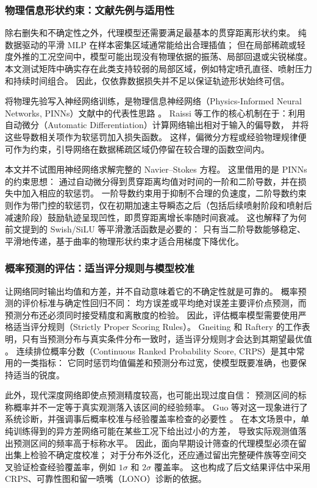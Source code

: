 \subsubsection{物理信息形状约束：文献先例与适用性}

除右删失和不确定性之外，代理模型还需要满足最基本的贯穿距离形状约束。
纯数据驱动的平滑 MLP 在样本密集区域通常能给出合理插值；
但在局部稀疏或轻度外推的工况空间中，模型可能出现没有物理依据的振荡、局部回退或尖锐梯度。
本文测试矩阵中确实存在此类支持较弱的局部区域，例如特定喷孔直径、喷射压力和持续时间组合。
因此，仅依靠数据损失并不足以保证轨迹形状始终可信。

将物理先验写入神经网络训练，是物理信息神经网络（Physics-Informed Neural Networks, PINNs）文献中的代表性思路 \cite{Raissi2019PINNs}。
Raissi 等工作的核心机制在于：利用自动微分（Automatic Differentiation）计算网络输出相对于输入的偏导数，
并将这些导数相关项作为软惩罚加入损失函数。
这样，偏微分方程或经验物理规律便可作为约束，引导网络在数据稀疏区域仍停留在较合理的函数空间内。

本文并不试图用神经网络求解完整的 Navier--Stokes 方程。
这里借用的是 PINNs 的约束思想：
通过自动微分得到贯穿距离均值对时间的一阶和二阶导数，并在损失中加入相应的软惩罚。
一阶导数约束用于抑制不合理的负速度，二阶导数约束则作为带门控的软惩罚，仅在初期加速主导瞬态之后（包括后续喷射阶段和喷射后减速阶段）鼓励轨迹呈现凹性，即贯穿距离增长率随时间衰减。
这也解释了为何前文提到的 Swish/SiLU 等平滑激活函数是必要的：
只有当二阶导数能够稳定、平滑地传递，基于曲率的物理形状约束才适合用梯度下降优化。

\subsubsection{概率预测的评估：适当评分规则与模型校准}

让网络同时输出均值和方差，并不自动意味着它的不确定性就是可靠的。
概率预测的评价标准与确定性回归不同：
均方误差或平均绝对误差主要评价点预测，而预测分布还必须同时接受精度和离散度的检验。
因此，评估概率模型需要使用严格适当评分规则（Strictly Proper Scoring Rules）。
Gneiting 和 Raftery 的工作表明，只有当预测分布与真实条件分布一致时，适当评分规则才会达到其期望最优值 \cite{GneitingRaftery2007CRPS}。
连续排位概率分数（Continuous Ranked Probability Score, CRPS）是其中常用的一类指标：
它同时惩罚均值偏差和预测分布过宽，使模型既要准确，也要保持适当的锐度。

此外，现代深度网络即使点预测精度较高，也可能出现过度自信：
预测区间的标称概率并不一定等于真实观测落入该区间的经验频率。
Guo 等对这一现象进行了系统诊断，并强调事后概率校准与经验覆盖率检查的必要性 \cite{Guo2017Calibration}。
在本文场景中，单纯训练得到的异方差网络可能在某些工况下给出过小的方差，
导致实际观测值落出预测区间的频率高于标称水平。
因此，面向早期设计筛查的代理模型必须在留出集上检验不确定度校准；
对于分布外泛化，还应通过留出完整硬件族等空间交叉验证检查经验覆盖率，例如 $1\sigma$ 和 $2\sigma$ 覆盖率。
这也构成了后文结果评估中采用 CRPS、可靠性图和留一喷嘴（LONO）诊断的依据。

